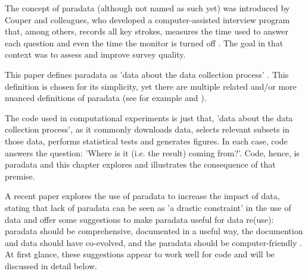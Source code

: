 The concept of paradata (although not named as such yet) 
was introduced by Couper and colleagues,
who developed a computer-assisted interview program
that, among others, records all key strokes,
measures the time used to answer each question 
and even the time the monitor is turned off \cite{couper1998measuring}.
The goal in that context was to assess and improve survey quality.


This paper defines paradata as 'data about the data collection 
process' \cite{choumert2019using}.
This definition is chosen for its simplicity, 
yet there are multiple related and/or more nuanced 
definitions of paradata (see for example \cite{huvila2022improving} 
and \cite{skold2022interrogating}).


The code used in computational experiments is just that, 
'data about the data collection 
process', as it commonly downloads data,
selects relevant subsets in those data,
performs statistical tests and generates figures.
In each case, code answers the question: 
'Where is it (i.e. the result) coming from?'.
Code, hence, is paradata and this chapter explores and illustrates the
consequence of that premise.


A recent paper explores the use of paradata to increase the impact of data,
stating that lack of paradata can be seen as 'a drastic constraint'
in the use of data and offer some suggestions to 
make paradata useful for data re(use):
paradata should be comprehensive, documented in a useful way, 
the documention and data should have co-evolved, 
and the paradata should be computer-friendly \cite{huvila2022improving}.
At first glance, these suggestions appear to work well for code
and will be discussed in detail below.


